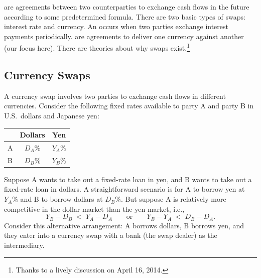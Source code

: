 
 are agreements between two counterparties to exchange cash flows in the future according to some predetermined formula.
There are two basic types of swaps: interest rate and currency.
An  occurs when two parties exchange interest payments periodically.
 are agreements to deliver one currency against another (our focus here).
There are theories about why swaps exist.\footnote{Thanks to a lively discussion on April 16, 2014.}

\suppstart
{}
\suppend

\subsection{Currency Swaps}


A currency swap involves two parties to exchange cash flows in different currencies.
Consider the following fixed rates available to party A and party B in U.S.\ dollars and Japanese yen:
\begin{center}
	\begin{tabular}{lcc}
		\toprule
		  & Dollars    & Yen        \\
		\midrule
		A & $D_{A}\%$ & $Y_{A}\%$ \\
		B & $D_{B}\%$ & $Y_{B}\%$ \\
		\bottomrule
	\end{tabular}
\end{center}
Suppose A wants to take out a fixed-rate loan in yen, and B wants to take out a fixed-rate loan in dollars.
A straightforward scenario is for A to borrow yen at $Y_{A}\%$ and B to borrow dollars at $D_{B}\%$.
But suppose A is relatively more competitive in the dollar market than the yen market, i.e.,
\[
	Y_{B}-D_{B} \;<\; Y_{A}-D_{A}
	\qquad\text{or}\qquad
	Y_{B}-Y_{A} \;<\; D_{B}-D_{A} .
\]
Consider this alternative arrangement: A borrows dollars, B borrows yen, and they enter into a currency swap with a bank (the swap dealer) as the intermediary.

\suppstart
{}
\suppend

